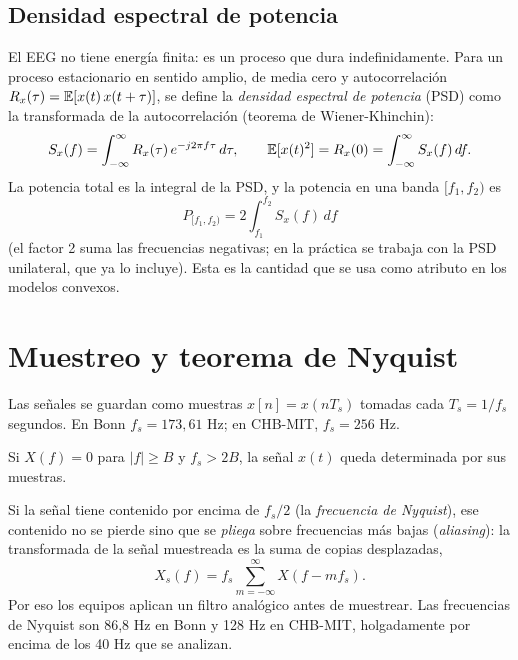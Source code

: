 \subsection{Densidad espectral de potencia}

El EEG no tiene energía finita: es un proceso que dura indefinidamente. Para un proceso estacionario en
sentido amplio, de media cero y autocorrelación $R_x(\tau) = \mathbb{E}[x(t)\,x(t+\tau)]$, se define la
\emph{densidad espectral de potencia} (PSD) como la transformada de la autocorrelación
(teorema de Wiener-Khinchin):
\begin{equation}
  S_x(f) = \int_{-\infty}^{\infty} R_x(\tau)\, e^{-j2\pi f\tau}\, d\tau,
  \qquad
  \mathbb{E}[x(t)^2] = R_x(0) = \int_{-\infty}^{\infty} S_x(f)\, df.
  \label{eq:wiener}
\end{equation}
La potencia total es la integral de la PSD, y la potencia en una banda $[f_1, f_2)$ es
\begin{equation}
  P_{[f_1,f_2)} = 2\int_{f_1}^{f_2} S_x(f)\,df
  \label{eq:potencia_banda}
\end{equation}
(el factor 2 suma las frecuencias negativas; en la práctica se trabaja con la PSD unilateral, que ya
lo incluye). Esta es la cantidad que se usa como atributo en los modelos convexos.

\section{Muestreo y teorema de Nyquist}

Las señales se guardan como muestras $x[n] = x(n T_s)$ tomadas cada $T_s = 1/f_s$ segundos.
En Bonn $f_s = 173{,}61$ Hz; en CHB-MIT, $f_s = 256$ Hz.

\begin{teorema}
Si $X(f) = 0$ para $|f| \ge B$ y $f_s > 2B$, la señal $x(t)$ queda determinada por sus muestras.
\end{teorema}

Si la señal tiene contenido por encima de $f_s/2$ (la \emph{frecuencia de Nyquist}), ese contenido no
se pierde sino que se \emph{pliega} sobre frecuencias más bajas (\emph{aliasing}): la transformada de la
señal muestreada es la suma de copias desplazadas,
\begin{equation}
  X_s(f) = f_s \sum_{m=-\infty}^{\infty} X(f - m f_s).
\end{equation}
Por eso los equipos aplican un filtro analógico antes de muestrear. Las frecuencias de Nyquist son
86,8 Hz en Bonn y 128 Hz en CHB-MIT, holgadamente por encima de los 40 Hz que se analizan.

